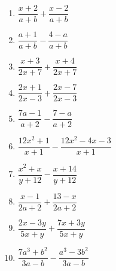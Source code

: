 \documentclass[10pt, a4paper]{article}
\begin{document}
\begin{enumerate}
\begin{multicols}{3}
\begin{enumerate}
			\item $\dfrac{x+2}{a+b}+\dfrac{x-2}{a+b}$ 
			\item $\dfrac{a+1}{a+b}-\dfrac{4-a}{a+b}$ 
			\item $\dfrac{x+3}{2x+7}+\dfrac{x+4}{2x+7}$ 
			\item $\dfrac{2x+1}{2x-3}+\dfrac{2x-7}{2x-3}$ 
			\item $\dfrac{7a-1}{a+2}-\dfrac{7-a}{a+2}$ 
			\item $\dfrac{12x^2+1}{x+1}-\dfrac{12x^2-4x-3}{x+1}$ 
			\item $\dfrac{x^2+x}{y+12}-\dfrac{x+14}{y+12}$ 
			\item $\dfrac{x-1}{2a+2}+\dfrac{13-x}{2a+2}$ 
			\item $\dfrac{2x-3y}{5x+y}+\dfrac{7x+3y}{5x+y}$ 
			\item $\dfrac{7a^3+b^2}{3a-b}-\dfrac{a^3-3b^2}{3a-b}$ 
		\end{enumerate}	
	\end{multicols}	
\end{enumerate}
\end{document}
